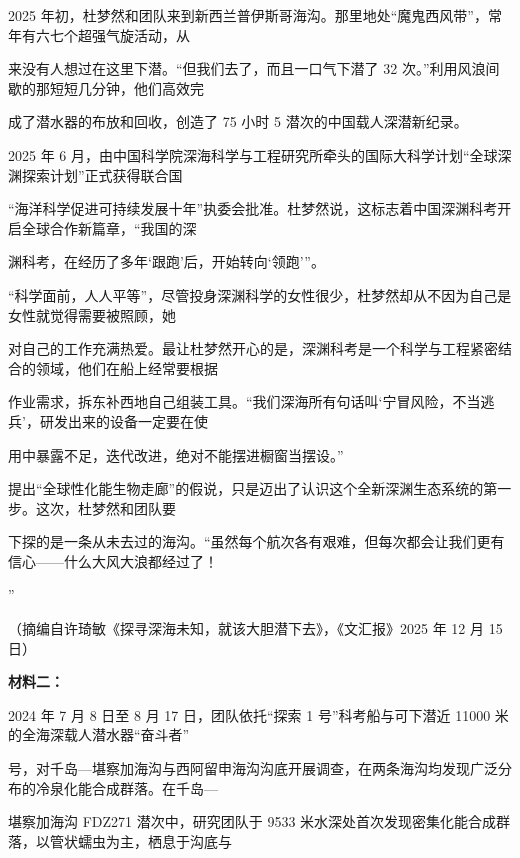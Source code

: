 \documentclass[UTF8,a4paper,fontset=fandol]{ctexart}
\begin{document}
\hspace*{1.8em}2025 年初，杜梦然和团队来到新西兰普伊斯哥海沟。那里地处“魔鬼西风带”，常年有六七个超强气旋活动，从\par
来没有人想过在这里下潜。“但我们去了，而且一口气下潜了 32 次。”利用风浪间歇的那短短几分钟，他们高效完\par
成了潜水器的布放和回收，创造了 75 小时 5 潜次的中国载人深潜新纪录。\par
\hspace*{1.8em}2025 年 6 月，由中国科学院深海科学与工程研究所牵头的国际大科学计划“全球深渊探索计划”正式获得联合国\par
“海洋科学促进可持续发展十年”执委会批准。杜梦然说，这标志着中国深渊科考开启全球合作新篇章，“我国的深\par
渊科考，在经历了多年‘跟跑’后，开始转向‘领跑’”。\par
\hspace*{1.8em}“科学面前，人人平等”，尽管投身深渊科学的女性很少，杜梦然却从不因为自己是女性就觉得需要被照顾，她\par
对自己的工作充满热爱。最让杜梦然开心的是，深渊科考是一个科学与工程紧密结合的领域，他们在船上经常要根据\par
作业需求，拆东补西地自己组装工具。“我们深海所有句话叫‘宁冒风险，不当逃兵’，研发出来的设备一定要在使\par
\clearpage
用中暴露不足，迭代改进，绝对不能摆进橱窗当摆设。”\par
\hspace*{1.8em}提出“全球性化能生物走廊”的假说，只是迈出了认识这个全新深渊生态系统的第一步。这次，杜梦然和团队要\par
下探的是一条从未去过的海沟。“虽然每个航次各有艰难，但每次都会让我们更有信心——什么大风大浪都经过了！\par
”\par
\hspace*{1.8em}（摘编自许琦敏《探寻深海未知，就该大胆潜下去》，《文汇报》2025 年 12 月 15 日）\par
\vspace{0.35em}\par
\textbf{材料二：}\par
\hspace*{1.8em}2024 年 7 月 8 日至 8 月 17 日，团队依托“探索 1 号”科考船与可下潜近 11000 米的全海深载人潜水器“奋斗者”\par
号，对千岛—堪察加海沟与西阿留申海沟沟底开展调查，在两条海沟均发现广泛分布的冷泉化能合成群落。在千岛—\par
堪察加海沟 FDZ271 潜次中，研究团队于 9533 米水深处首次发现密集化能合成群落，以管状蠕虫为主，栖息于沟底与\par
\end{document}
